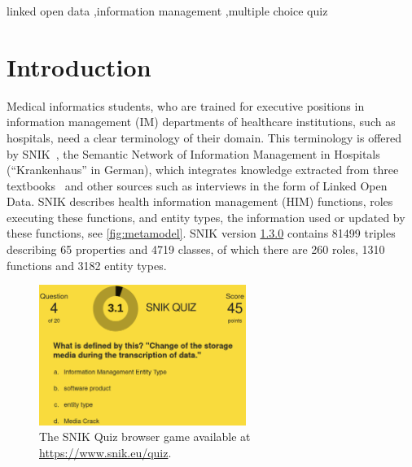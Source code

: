 \documentclass{IOS-Book-Article}     %
\newcommand{\citep}{\cite}%
\newcommand{\snikversion}{1.3.0}
\newcommand{\snikversionlink}{\href{https://github.com/snikproject/ontology/releases/tag/\snikversion}{\snikversion}}
\newcommand{\sniktriples}{\num{81499}}
\newcommand{\snikclasses}{\num{4719}}
\newcommand{\snikroles}{260}
\newcommand{\snikfunctions}{\num{1310}}
\newcommand{\snikentitytypes}{\num{3182}}
\newcommand{\snikproperties}{65}
\begin{document}
\begin{frontmatter}

\begin{keyword}
linked open data \sep information management \sep multiple choice quiz
\end{keyword}
\end{frontmatter}

\section{Introduction}
Medical informatics students, who are trained for executive positions in information management (IM) departments of healthcare institutions, such as hospitals, need a clear terminology of their domain.
This terminology is offered by SNIK~\citep{semantischesnetz,sniktec}, the Semantic Network of Information Management in Hospitals (\enquote{Krankenhaus} in German), which integrates knowledge extracted from three textbooks~\citep{bb,ob,he} and other sources such as interviews in the form of Linked Open Data.
SNIK describes health information management (HIM) functions, roles executing these functions, and entity types, the information used or updated by these functions, see \cref{fig:metamodel}.
SNIK version \snikversionlink{} contains \sniktriples{} triples describing \snikproperties{} properties and \snikclasses{} classes, of which there are \snikroles{} roles, \snikfunctions{} functions and \snikentitytypes{} entity types.
%
\begin{figure}
\caption{The SNIK Quiz browser game available at \url{https://www.snik.eu/quiz}.}
\label{fig:snikquiz}
\centering
\includegraphics[width=0.6\textwidth]{img/snik-quiz.png}
\end{figure}
\end{document}

